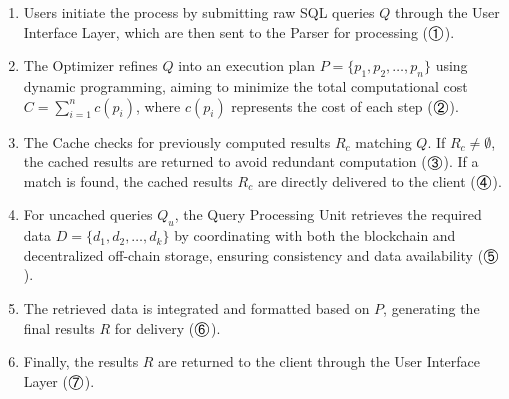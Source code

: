 \begin{enumerate}[leftmargin=*]
    \item Users initiate the process by submitting raw SQL queries \( Q \) through the User Interface Layer, which are then sent to the Parser for processing (\(\raisebox{-0.5ex}{\fontsize{14pt}{12pt}\selectfont\ding{192}}\)).

    \item The Optimizer refines \( Q \) into an execution plan \( P = \{p_1, p_2, \dots, p_n\} \) using dynamic programming, aiming to minimize the total computational cost \( C = \sum_{i=1}^n c(p_i) \), where \( c(p_i) \) represents the cost of each step (\(\raisebox{-0.5ex}{\fontsize{14pt}{12pt}\selectfont\ding{193}}\)).

    \item The Cache checks for previously computed results \( R_c \) matching \( Q \). 
    If \( R_c \neq \emptyset \), the cached results are returned to avoid redundant computation (\(\raisebox{-0.5ex}{\fontsize{14pt}{12pt}\selectfont\ding{194}}\)).
    If a match is found, the cached results \( R_c \) are directly delivered to the client (\(\raisebox{-0.5ex}{\fontsize{14pt}{12pt}\selectfont\ding{195}}\)).

    \item For uncached queries \( Q_u \), the Query Processing Unit retrieves the required data \( D = \{d_1, d_2, \dots, d_k\} \) by coordinating with both the blockchain and decentralized off-chain storage, ensuring consistency and data availability (\(\raisebox{-0.5ex}{\fontsize{14pt}{12pt}\selectfont\ding{196}}\)). 
    \item
    The retrieved data is integrated and formatted based on \( P \), generating the final results \( R \) for delivery (\(\raisebox{-0.5ex}{\fontsize{14pt}{12pt}\selectfont\ding{197}}\)).
    
    \item 
    Finally, the results \( R \) are returned to the client through the User Interface Layer (\(\raisebox{-0.5ex}{\fontsize{14pt}{12pt}\selectfont\ding{198}}\)).
\end{enumerate}


